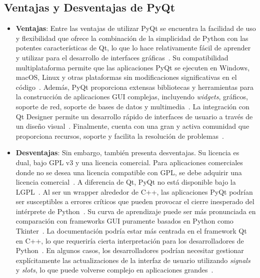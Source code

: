 \subsection{Ventajas y Desventajas de PyQt}
\begin{itemize}
    \item \textbf{Ventajas}: Entre las ventajas de utilizar PyQt se encuentra la facilidad de uso y flexibilidad que ofrece la combinación de la simplicidad de Python con las potentes características de Qt, lo que lo hace relativamente fácil de aprender y utilizar para el desarrollo de interfaces gráficas~\cite{ontosight_pyqt_basics}. Su compatibilidad multiplataforma permite que las aplicaciones PyQt se ejecuten en Windows, macOS, Linux y otras plataformas sin modificaciones significativas en el código~\cite{lemberg}. Además, PyQt proporciona extensas bibliotecas y herramientas para la construcción de aplicaciones GUI complejas, incluyendo \textit{widgets}, gráficos, soporte de red, soporte de bases de datos y multimedia~\cite{tutorialspoint_pyqt}. La integración con Qt Designer permite un desarrollo rápido de interfaces de usuario a través de un diseño visual~\cite{lemberg}. Finalmente, cuenta con una gran y activa comunidad que proporciona recursos, soporte y facilita la resolución de problemas~\cite{lemberg}.
    \item \textbf{Desventajas}: Sin embargo, también presenta desventajas. Su licencia es dual, bajo GPL v3 y una licencia comercial. Para aplicaciones comerciales donde no se desea una licencia compatible con GPL, se debe adquirir una licencia comercial~\cite{tutorialspoint_pyqt}. A diferencia de Qt, PyQt no está disponible bajo la LGPL~\cite{pyqt_wiki}. Al ser un wrapper alrededor de C++, las aplicaciones PyQt podrían ser susceptibles a errores críticos que pueden provocar el cierre inesperado del intérprete de Python~\cite{gfg_pyqt_vs_tkinter}. Su curva de aprendizaje puede ser más pronunciada en comparación con frameworks GUI puramente basados en Python como Tkinter~\cite{itsupplychain}. La documentación podría estar más centrada en el framework Qt en C++, lo que requeriría cierta interpretación para los desarrolladores de Python~\cite{gfg_pyqt_vs_tkinter}. En algunos casos, los desarrolladores podrían necesitar gestionar explícitamente las actualizaciones de la interfaz de usuario utilizando \textit{signals} y \textit{slots}, lo que puede volverse complejo en aplicaciones grandes~\cite{gfg_pyqt_vs_tkinter}.
\end{itemize}